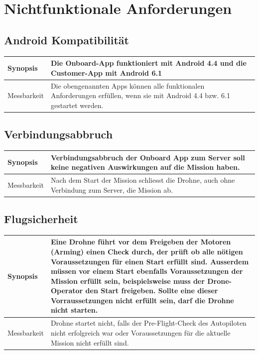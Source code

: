 \newpage
\section{Nichtfunktionale Anforderungen}

\subsection{Android Kompatibilität}
\begin{tabular}{|p{}|p{}|} \hline
	Synopsis & Die Onboard-App funktioniert mit Android 4.4 und die Customer-App mit Android 6.1\\ \hline
	Messbarkeit & Die obengenannten Apps können alle funktionalen Anforderungen erfüllen, wenn sie mit Android 4.4 bzw. 6.1 gestartet werden.\\ \hline
\end{tabular}

\subsection{Verbindungsabbruch}
\begin{tabular}{|p{}|p{}|} \hline
	Synopsis & Verbindungsabbruch der Onboard App zum Server soll keine negativen Auswirkungen auf die Mission haben.  \\ \hline
		
	Messbarkeit & Nach dem Start der Mission schliesst die Drohne, auch ohne Verbindung zum Server, die Mission ab. \\ \hline
\end{tabular}

\subsection{Flugsicherheit}
\begin{tabular}{|p{}|p{}|} \hline
	Synopsis & Eine Drohne führt vor dem Freigeben der Motoren (Arming) einen Check durch, der prüft ob alle nötigen Voraussetzungen für einen Start erfüllt sind. Ausserdem müssen vor einem Start ebenfalls Voraussetzungen der Mission erfüllt sein, beispielsweise muss der Drone-Operator den Start freigeben. Sollte eine dieser Vorraussetzungen nicht erfüllt sein, darf die Drohne nicht starten.  \\ \hline
	
	Messbarkeit & Drohne startet nicht, falls der Pre-Flight-Check des Autopiloten nicht erfolgreich war oder Voraussetzungen für die aktuelle Mission nicht erfüllt sind. \\ \hline
\end{tabular}
